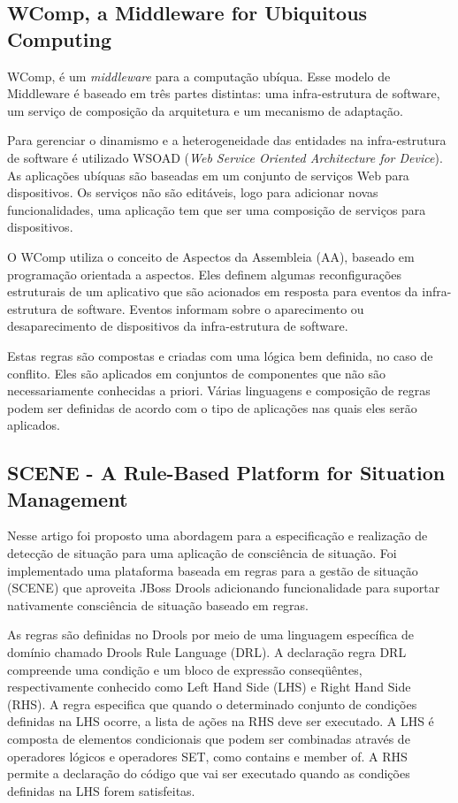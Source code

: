 \documentclass[12pt,a4paper,compsoc]{IEEEtran}
\begin{document}
\subsection{WComp, a Middleware for Ubiquitous Computing}

  WComp, é um \textit{middleware} para a computação ubíqua. Esse modelo de Middleware é baseado em
  três partes distintas: uma infra-estrutura de software,  um serviço de composição da arquitetura e
  um mecanismo de adaptação.
  
  Para gerenciar o dinamismo e a heterogeneidade das entidades na infra-estrutura de software é
  utilizado WSOAD (\textit{Web Service Oriented Architecture for Device}). As aplicações ubíquas são
  baseadas em um conjunto de serviços Web para dispositivos. Os serviços não são editáveis, logo
  para adicionar novas funcionalidades, uma aplicação tem que ser uma composição de serviços para
  dispositivos.
  
  O WComp utiliza o conceito de Aspectos da Assembleia (AA), baseado em programação orientada a
  aspectos. Eles definem algumas reconfigurações estruturais de um aplicativo que são acionados em
  resposta para eventos da infra-estrutura de software. Eventos informam sobre o aparecimento ou
  desaparecimento de dispositivos da infra-estrutura de software.
  
  Estas regras são compostas e criadas com uma lógica bem definida, no caso de conflito. Eles são
  aplicados em conjuntos de componentes que não são necessariamente conhecidas a priori. Várias
  linguagens e composição de regras podem ser definidas de acordo com o tipo de aplicações nas
  quais eles serão aplicados.


\subsection{SCENE - A Rule-Based Platform for Situation Management}

  Nesse artigo foi proposto uma abordagem para a especificação e realização de detecção de situação
  para uma aplicação de consciência de situação. Foi implementado uma plataforma baseada em regras
  para a gestão de situação (SCENE) que aproveita JBoss Drools adicionando funcionalidade para
  suportar nativamente consciência de situação baseado em regras.
  
  As regras são definidas no Drools por meio de uma linguagem específica de domínio chamado Drools
  Rule Language (DRL). A declaração regra DRL compreende uma condição e um bloco de expressão
  conseqüêntes, respectivamente conhecido como  Left Hand Side (LHS) e Right Hand Side (RHS). A
  regra especifica que quando o determinado conjunto de condições definidas na LHS ocorre, a lista
  de ações na RHS deve ser executado. A LHS é composta de elementos condicionais que podem ser
  combinadas através de operadores lógicos e operadores SET, como  contains e member of. A RHS
  permite a declaração do código que vai ser executado quando as condições definidas na LHS forem
  satisfeitas.
  
\end{document}
